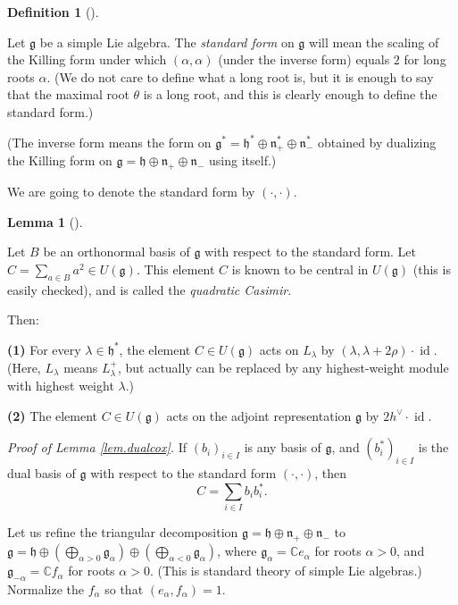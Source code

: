 \documentclass
[numbers=enddot,12pt,final,onecolumn,german,notitlepage]{scrartcl}%
\theoremstyle{definition}
\newtheorem{lem}[theo]{Lemma}
\newenvironment{lemma}[1][]
{\begin{lem}[#1]\begin{leftbar}}
{\end{leftbar}\end{lem}}
\newtheorem{defi}[theo]{Definition}
\newenvironment{definition}[1][]
{\begin{defi}[#1]\begin{leftbar}}
{\end{leftbar}\end{defi}}
\begin{document}
\begin{definition}
\label{def.standform}Let $\mathfrak{g}$ be a simple Lie algebra. The
\textit{standard form} on $\mathfrak{g}$ will mean the scaling of the Killing
form under which $\left(  \alpha,\alpha\right)  $ (under the inverse form)
equals $2$ for long roots $\alpha$. (We do not care to define what a long root
is, but it is enough to say that the maximal root $\theta$ is a long root, and
this is clearly enough to define the standard form.)

(The inverse form means the form on $\mathfrak{g}^{\ast}=\mathfrak{h}^{\ast
}\oplus\mathfrak{n}_{+}^{\ast}\oplus\mathfrak{n}_{-}^{\ast}$ obtained by
dualizing the Killing form on $\mathfrak{g}=\mathfrak{h}\oplus\mathfrak{n}%
_{+}\oplus\mathfrak{n}_{-}$ using itself.)

We are going to denote the standard form by $\left(  \cdot,\cdot\right)  $.
\end{definition}

\begin{lemma}
\label{lem.dualcox}Let $B$ be an orthonormal basis of $\mathfrak{g}$ with
respect to the standard form. Let $C=\sum\limits_{a\in B}a^{2}\in U\left(
\mathfrak{g}\right)  $. This element $C$ is known to be central in $U\left(
\mathfrak{g}\right)  $ (this is easily checked), and is called the
\textit{quadratic Casimir}.

Then:

\textbf{(1)} For every $\lambda\in\mathfrak{h}^{\ast}$, the element $C\in
U\left(  \mathfrak{g}\right)  $ acts on $L_{\lambda}$ by $\left(
\lambda,\lambda+2\rho\right)  \cdot\operatorname*{id}$. (Here, $L_{\lambda}$
means $L_{\lambda}^{+}$, but actually can be replaced by any highest-weight
module with highest weight $\lambda$.)

\textbf{(2)} The element $C\in U\left(  \mathfrak{g}\right)  $ acts on the
adjoint representation $\mathfrak{g}$ by $2h^{\vee}\cdot\operatorname*{id}$.
\end{lemma}

\textit{Proof of Lemma \ref{lem.dualcox}.} If $\left(  b_{i}\right)  _{i\in
I}$ is any basis of $\mathfrak{g}$, and $\left(  b_{i}^{\ast}\right)  _{i\in
I}$ is the dual basis of $\mathfrak{g}$ with respect to the standard form
$\left(  \cdot,\cdot\right)  $, then%
\begin{equation}
C=\sum\limits_{i\in I}b_{i}b_{i}^{\ast}. \label{pf.dualcox.Csum}%
\end{equation}


Let us refine the triangular decomposition $\mathfrak{g}=\mathfrak{h}%
\oplus\mathfrak{n}_{+}\oplus\mathfrak{n}_{-}$ to $\mathfrak{g}=\mathfrak{h}%
\oplus\left(  \bigoplus\limits_{\alpha>0}\mathfrak{g}_{\alpha}\right)
\oplus\left(  \bigoplus\limits_{\alpha<0}\mathfrak{g}_{\alpha}\right)  $,
where $\mathfrak{g}_{\alpha}=\mathbb{C}e_{\alpha}$ for roots $\alpha>0$, and
$\mathfrak{g}_{-\alpha}=\mathbb{C}f_{\alpha}$ for roots $\alpha>0$. (This is
standard theory of simple Lie algebras.) Normalize the $f_{\alpha}$ so that
$\left(  e_{\alpha},f_{\alpha}\right)  =1$.
\end{document}
